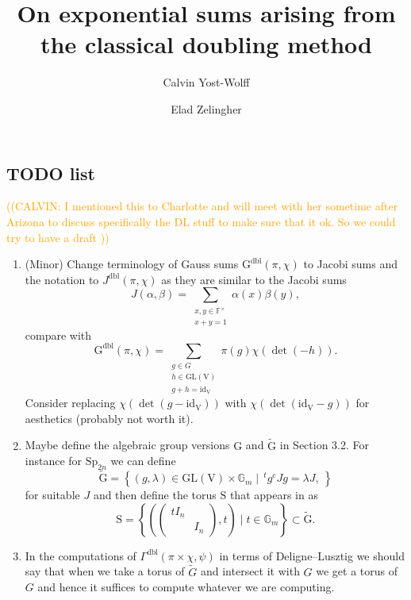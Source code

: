 \documentclass[12pt, reqno]{amsart}
\title{On exponential sums arising from the classical doubling method}
\author{Calvin Yost-Wolff}
\author{Elad Zelingher}
\theoremstyle{definition}
\theoremstyle{definition}
\theoremstyle{definition}
\newcommand{\multiplicativegroup}[1]{#1^{\times}}
\newcommand{\idmap}{\mathrm{id}}
\newcommand{\hermitianSpace}{\mathrm{V}}
\newcommand{\fieldCharacter}{\psi}
\newcommand{\transpose}[1]{\, {}^{t}#1}
\newcommand{\involution}[1]{#1^{c}}
\newcommand{\IdentityMatrix}[1]{I_{#1}}
\newcommand{\GL}{\mathrm{GL}}
\newcommand{\Sp}{\mathrm{Sp}}
\newcommand{\GroupExtension}[1]{\widetilde{#1}}
\newcommand{\finiteField}{\mathbb{F}}
\newcommand{\multiplcativeScheme}{\mathbb{G}_m}
\newcommand{\dblGaussSumScalar}[2]{\mathrm{G}^{\mathrm{dbl}}\left(#1, #2\right)}
\newcommand{\dblGammaFactor}[3]{\Gamma^{\mathrm{dbl}}\left(#1 \times #2, #3\right)}
\newcommand{\algebraicGroup}[1]{\boldsymbol{\mathrm{#1}}}
\newcommand{\calvin}[1]{\textcolor{orange}{\sffamily ((CALVIN: #1))}}
\begin{document}
\begin{abstract}
\end{abstract}
\maketitle

\subsection{TODO list}
\calvin{I mentioned this to Charlotte and will meet with her sometime after Arizona to discuss specifically the DL stuff to make sure that it ok. So we could try to have a draft }
\begin{enumerate}
	\item (Minor) Change terminology of Gauss sums $\dblGaussSumScalar{\pi}{\chi}$ to Jacobi sums and the notation to $J^{\mathrm{dbl}}\left(\pi, \chi\right)$ as they are similar to the Jacobi sums
	$$J\left(\alpha, \beta\right) = \sum_{\substack{x,y \in \multiplicativegroup{\finiteField}\\
	x+y = 1}} \alpha\left(x\right) \beta\left(y\right),$$
	compare with $$\dblGaussSumScalar{\pi}{\chi} = \sum_{\substack{g \in G\\
			h \in \GL\left(\hermitianSpace\right)\\
	g + h = \idmap_{\hermitianSpace}}} \pi\left(g\right) \chi\left(\det\left(-h\right)\right).$$
	Consider replacing $\chi\left(\det\left(g - \idmap_{\hermitianSpace}\right)\right)$ with $\chi\left(\det\left(\idmap_{\hermitianSpace} - g\right)\right)$ for aesthetics (probably not worth it).
	\item Maybe define the algebraic group versions $\algebraicGroup{G}$ and $\GroupExtension{\algebraicGroup{G}}$ in Section 3.2. For instance for $\algebraicGroup{\Sp}_{2n}$ we can define
	$$\algebraicGroup{\tilde{G}} = \left\{ \left(g,\lambda\right) \in \algebraicGroup{\GL}\left(\hermitianSpace\right) \times \multiplcativeScheme \mid \involution{\transpose{g}} J g = \lambda J,\ \right\}$$ for suitable $J$ and then define the torus $\algebraicGroup{S}$ that appears in \cite[Page 140]{DigneMichel2020} as $$\algebraicGroup{S} = \left\{\left(\begin{pmatrix}
		t \IdentityMatrix{n}\\
		& \IdentityMatrix{n}
	\end{pmatrix}, t\right) \mid t \in \multiplcativeScheme \right\} \subset \GroupExtension{\algebraicGroup{G}}.$$
	\item In the computations of $\dblGammaFactor{\pi}{\chi}{\fieldCharacter}$ in terms of Deligne--Lusztig we should say that when we take a torus of $\GroupExtension{G}$ and intersect it with $G$ we get a torus of $G$ and hence it suffices to compute whatever we are computing.

\end{enumerate}
\end{document}
